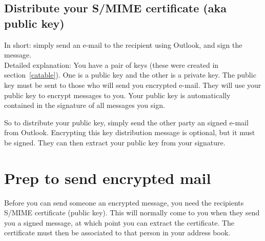 \documentclass[pdftex,12pt,titlepage=false]{scrartcl}
\begin{document}
\subsection{Distribute your S/MIME certificate (aka public key)}
In short: simply send an e-mail to the recipient using Outlook, and sign the message.\\

Detailed explanation: You have a pair of keys (these were created in
section~\ref{catable}).  One is a public key and the other is a
private key.  The public key must be sent to those who will send you
encrypted e-mail.  They will use your public key to encrypt messages
to you.  Your public key is automatically contained in the signature
of all messages you sign.

So to distribute your public key, simply send the other party an
signed e-mail from Outlook.  Encrypting this key distribution message
is optional, but it must be signed.  They can then extract your public
key from your signature.

\section{Prep to send encrypted mail%
}
Before you can send someone an encrypted message, you need the
recipients S/MIME certificate (public key).  This will normally come
to you when they send you a signed message, at which point you can
extract the certificate.  The certificate must then be associated to
that person in your address book.
\end{document}

